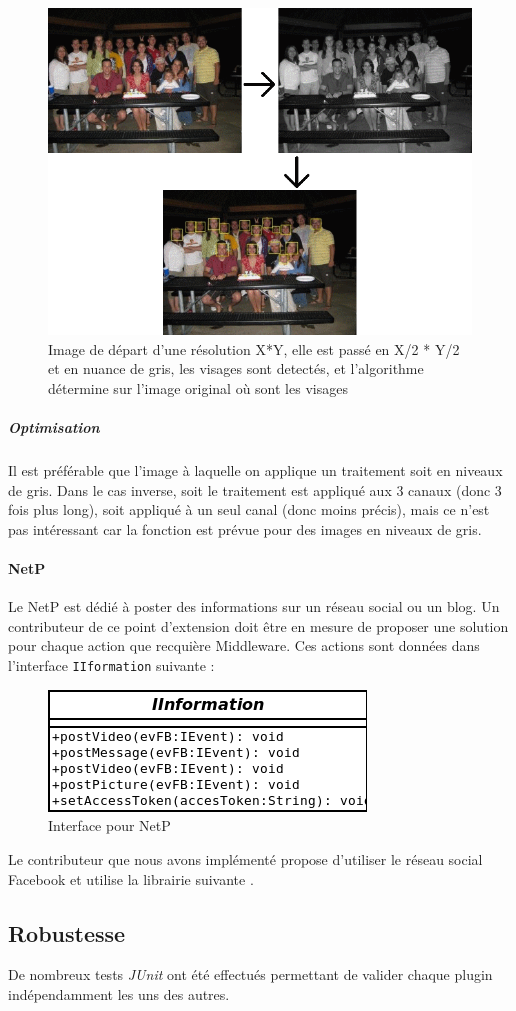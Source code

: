 				\begin{figure}[!h]
					\centering
					\includegraphics[scale=0.50]{img/reasoningVisages.png}
					\caption{Image de départ d'une résolution X*Y, elle est passé en X/2 * Y/2 et en nuance de gris, les visages sont detectés, et l'algorithme détermine sur l'image original où sont les visages}
					\label{divisionRGB}
				\end{figure}
			
			\subparagraph{Optimisation}
				Il est préférable que l'image à laquelle on applique un traitement soit en niveaux de gris. Dans le cas inverse, soit le traitement est appliqué aux 3 canaux (donc 3 fois plus long), soit appliqué à un seul canal (donc moins précis), mais ce n'est pas intéressant car la fonction est prévue pour des images en niveaux de gris.
		\paragraph{NetP}
			Le  NetP est dédié à poster des informations sur un  réseau social ou un blog. Un contributeur de ce point d'extension doit être en mesure de proposer une solution pour chaque action que recquière Middleware. Ces actions sont données dans l'interface \verb+IIformation+ suivante :
			\begin{figure}[!htbp]
				\centering
				\includegraphics[scale=0.50]{img/iinterface}
				\caption{Interface pour NetP}
				\label{fig:IInterface}
			\end{figure}

			Le contributeur que nous avons implémenté propose d'utiliser le réseau social Facebook et utilise la librairie suivante \cite{restFB}.

\subsection{Robustesse}
	De nombreux tests \emph{JUnit} ont été effectués permettant de valider chaque plugin indépendamment les uns des autres. 
	